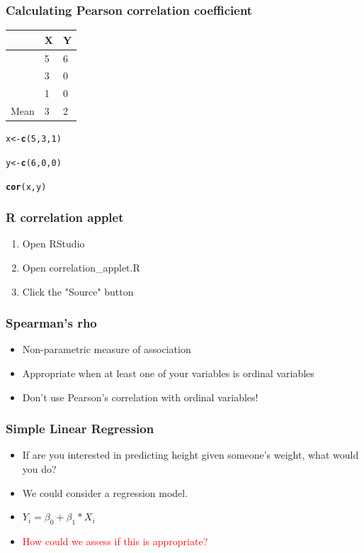\documentclass[dvipsnames]{beamer}\usepackage[]{graphicx}\usepackage[]{color}
\makeatletter
\newcommand{\hlnum}[1]{\textcolor[rgb]{0.686,0.059,0.569}{#1}}%
\newcommand{\hlstd}[1]{\textcolor[rgb]{0.345,0.345,0.345}{#1}}%
\newcommand{\hlkwb}[1]{\textcolor[rgb]{0.69,0.353,0.396}{#1}}%
\newcommand{\hlkwd}[1]{\textcolor[rgb]{0.737,0.353,0.396}{\textbf{#1}}}%
\newenvironment{kframe}{%
 \def\at@end@of@kframe{}%
 \ifinner\ifhmode%
  \def\at@end@of@kframe{\end{minipage}}%
  \begin{minipage}{\columnwidth}%
 \fi\fi%
 \def\FrameCommand##1{\hskip\@totalleftmargin \hskip-\fboxsep
 \colorbox{shadecolor}{##1}\hskip-\fboxsep
     \hskip-\linewidth \hskip-\@totalleftmargin \hskip\columnwidth}%
 \MakeFramed {\advance\hsize-\width
   \@totalleftmargin\z@ \linewidth\hsize
   \@setminipage}}%
 {\par\unskip\endMakeFramed%
 \at@end@of@kframe}
\newenvironment{knitrout}{}{} %
\makeatother
\begin{document}
\begin{frame}
\frametitle{Calculating Pearson correlation coefficient}
\begin{center}
\begin{tabular}{lll}
\hline
&X	& Y \\
\hline
&5 &	6 \\
&3	&0 \\
&1	&0 \\
\hline
Mean &	3	&2 \\
\hline
\end{tabular}
\end{center}
\begin{knitrout}
\color{fgcolor}\begin{kframe}
\begin{alltt}
\hlstd{x} \hlkwb{<-} \hlkwd{c}\hlstd{(}\hlnum{5}\hlstd{,} \hlnum{3}\hlstd{,} \hlnum{1}\hlstd{)}

\hlstd{y} \hlkwb{<-} \hlkwd{c}\hlstd{(}\hlnum{6}\hlstd{,} \hlnum{0}\hlstd{,} \hlnum{0}\hlstd{)}

\hlkwd{cor}\hlstd{(x, y)}
\end{alltt}
\end{kframe}
\end{knitrout}
\end{frame}



\begin{frame}
\frametitle{R correlation applet}
\begin{enumerate}
\item Open RStudio 
\item Open correlation\_applet.R
\item Click the "Source" button
\end{enumerate}
\end{frame}

\begin{frame}
\frametitle{Spearman's rho}
\begin{itemize}
\item Non-parametric measure of association
\item Appropriate when at least one of your variables is ordinal variables
\item Don't use Pearson's correlation with ordinal variables!
\end{itemize}
\end{frame}

\begin{frame}
\frametitle{Simple Linear Regression}
\begin{itemize}
    \item<1-> If are you interested in predicting height given someone's weight, what would you do?
  \item<2-> We could consider a regression model.
  \item<3-> $Y_i = \beta_0 + \beta_1 * X_i$
  \item<4->  \textcolor{red}{How could we assess if this is appropriate?}
\end{itemize}
\end{frame}
\end{document}
